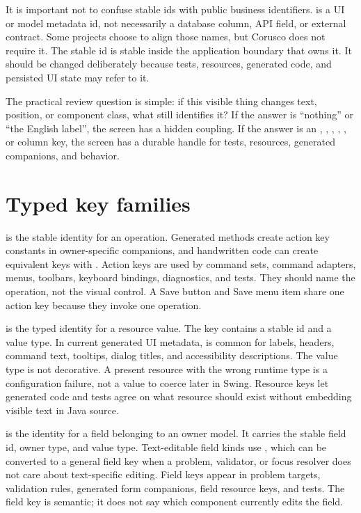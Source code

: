 It is important not to confuse stable ids with public business identifiers.
 is a UI or model metadata id, not necessarily a database
column, API field, or external contract. Some projects choose to align those
names, but Corusco does not require it. The stable id is stable inside the
application boundary that owns it. It should be changed deliberately because
tests, resources, generated code, and persisted UI state may refer to it.

The practical review question is simple: if this visible thing changes text,
position, or component class, what still identifies it? If the answer is
``nothing'' or ``the English label'', the screen has a hidden coupling. If the
answer is an , , ,
, , or column key, the screen has a durable
handle for tests, resources, generated companions, and behavior.

\section{Typed key families}

 is the stable identity for an operation. Generated
 methods create action key constants in owner-specific
companions, and handwritten code can create equivalent keys with
. Action keys are used by command sets, command adapters,
menus, toolbars, keyboard bindings, diagnostics, and tests. They should name
the operation, not the visual control. A Save button and Save menu item share
one action key because they invoke one operation.

 is the typed identity for a resource value. The key
contains a stable id and a value type. In current generated UI metadata,
 is common for labels, headers, command text,
tooltips, dialog titles, and accessibility descriptions. The value type is not
decorative. A present resource with the wrong runtime type is a configuration
failure, not a value to coerce later in Swing. Resource keys let generated code
and tests agree on what resource should exist without embedding visible text in
Java source.

 is the identity for a field belonging to an owner model.
It carries the stable field id, owner type, and value type. Text-editable field
kinds use , which can be converted to a general field key
when a problem, validator, or focus resolver does not care about text-specific
editing. Field keys appear in problem targets, validation rules, generated
form companions, field resource keys, and tests. The field key is semantic; it
does not say which component currently edits the field.

